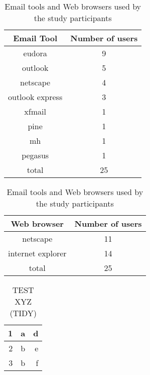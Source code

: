 
\begin{table}[h!tb]
\begin{minipage}{3.0 in}
\begin{small}
\begin{tabular}{|c|c|}
\hline
{\bf Email Tool} & {\bf Number of users} \\
\hline
    eudora &          9 \\
\hline
   outlook &          5 \\
\hline
  netscape &          4 \\
\hline
outlook express &          3 \\
\hline
    xfmail &          1 \\
\hline
      pine &          1 \\
\hline
        mh &          1 \\
\hline
   pegasus &          1 \\
\hline
     total &         25 \\
\hline
\end{tabular}  
\end{small}
\end{minipage}
\begin{minipage}{3.0 in}
\begin{small}
\begin{tabular}{|c|c|}
\hline
{\bf Web browser} & {\bf Number of users} \\
\hline
  netscape &         11 \\
\hline
internet explorer &         14 \\
\hline
     total &         25 \\
\hline
\end{tabular}  
\end{small}
\end{minipage}
\begin{center}
\caption{Email tools and Web browsers used by the study participants}
\label{table:chapter3_email_and_browser_tools}
\end{center}
\end{table}


\begin{small}
\begin{table}
	\begin{center}
		\begin{tabular}{|r|r|r|}
		\hline
         1 &          a &          d \\
		\hline
         2 &          b &          e \\
		\hline
         3 &          b &          f \\
		\hline
		\end{tabular}
	\caption{TEST XYZ (TIDY)}
	\label{table:test}
	\end{center}
\end{table}
\end{small}


